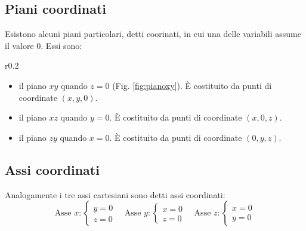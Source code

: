 \documentclass{article}     %
\begin{document}
        \subsection{Piani coordinati}
            Esistono alcuni piani particolari, detti coorinati, in cui una delle variabili assume il valore 0. Essi sono:
            \begin{wrapfigure}{r}{0.2\textwidth}
                \begin{center}
                \end{center}
                \caption{Il piano\\ coordinato $xy$}
                \label{fig:pianoxy}
            \end{wrapfigure}
            \begin{itemize}
                \item il piano $xy$ quando $z=0$ (Fig. \ref{fig:pianoxy}). È costituito da punti di coordinate $(x,y,0)$.
                \item il piano $xz$ quando $y=0$. È costituito da punti di coordinate $(x,0,z)$.
                \item il piano $zy$ quando $x=0$. È costituito da punti di coordinate $(0,y,z)$.
            \end{itemize}
            
            \subsection{Assi coordinati}
            Analogamente i tre assi cartesiani sono detti assi coordinati: 
            \[\text{Asse }x:\left\{\begin{array}{c}
                y=0\\
                z=0
            \end{array}\right.
            \text{~~~Asse }y:\left\{\begin{array}{c}
                x=0\\
                z=0
            \end{array}\right.
            \text{~~~Asse }z:\left\{\begin{array}{c}
                x=0\\
                y=0
            \end{array}\right.
            \]
\end{document}
